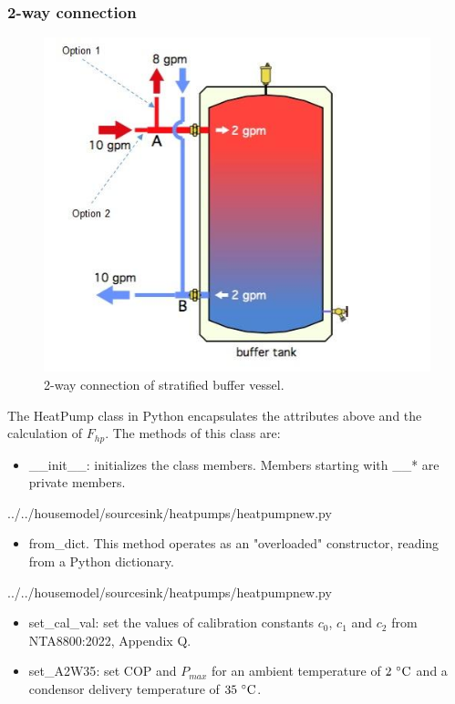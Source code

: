 \subsubsection{2-way connection}

\begin{figure}[H]
	\centering
	\includegraphics[width=0.5\columnwidth]{Figures/2-way buffer connection}
	\caption[Short title]{2-way connection of stratified buffer vessel.}
	\label{fig:2way}
\end{figure} 


The \textsf{HeatPump} class in Python encapsulates the attributes above and the calculation of $F_{hp}$. The methods of this class are:
\begin{itemize}
	\item \textsf{\_\_init\_\_}: initializes the class members. Members starting with \_\_* are private members.
\end{itemize}

 
{../../housemodel/sourcesink/heatpumps/heatpumpnew.py}

\begin{itemize}
	\item \textsf{from\_dict}. This method operates as an "overloaded" constructor, reading from a Python \textsf{dictionary}.
\end{itemize}

 
{../../housemodel/sourcesink/heatpumps/heatpumpnew.py}

\begin{itemize}
	\item \textsf{set\_cal\_val}: set the values of calibration constants $c_0$, $c_1$ and $c_2$ from NTA8800:2022, Appendix Q.
	\item \textsf{set\_A2W35}: set COP and $P_{max}$ for an ambient temperature of $2~ ^\circ\mathrm{C}$ and a condensor delivery temperature of  $35~^\circ\mathrm{C}$.
\end{itemize}

